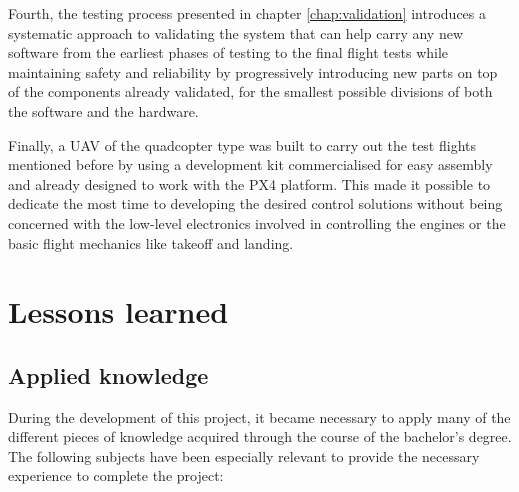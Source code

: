 Fourth, the testing process presented in chapter \ref{chap:validation} introduces a systematic approach to validating the system that can help carry any new software from the earliest phases of testing to the final flight tests while maintaining safety and reliability by progressively introducing new parts on top of the components already validated, for the smallest possible divisions of both the software and the hardware.

Finally, a UAV of the quadcopter type was built to carry out the test flights mentioned before by using a development kit commercialised for easy assembly and already designed to work with the PX4 platform.
This made it possible to dedicate the most time to developing the desired control solutions without being concerned with the low-level electronics involved in controlling the engines or the basic flight mechanics like takeoff and landing.


\section{Lessons learned}
\label{sec:lessons-learned}

\subsection{Applied knowledge}

During the development of this project, it became necessary to apply many of the different pieces of knowledge acquired through the course of the bachelor's degree.
The following subjects have been especially relevant to provide the necessary experience to complete the project:

